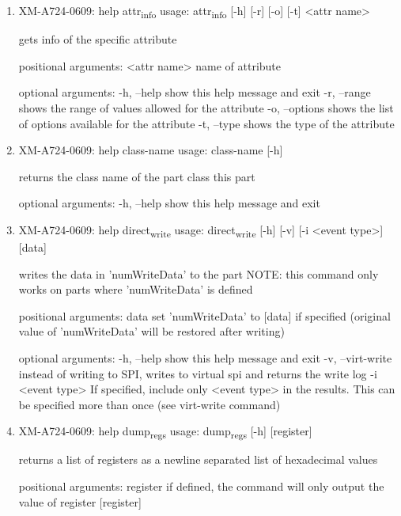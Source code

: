 \documentclass[11pt]{article}
\begin{document}
\begin{enumerate}
\item XM-A724-0609: help attr\textsubscript{info}
\label{sec:org6c905d6}
usage: attr\textsubscript{info} [-h] [-r] [-o] [-t] <attr name>

gets info of the specific attribute

positional arguments:
  <attr name>    name of attribute

optional arguments:
  -h, --help     show this help message and exit
  -r, --range    shows the range of values allowed for the attribute
  -o, --options  shows the list of options available for the attribute
  -t, --type     shows the type of the attribute

\item XM-A724-0609: help class-name
\label{sec:orgdc27a16}
usage: class-name [-h]

returns the class name of the part class this part

optional arguments:
  -h, --help  show this help message and exit

\item XM-A724-0609: help direct\textsubscript{write}
\label{sec:org0eb819e}
usage: direct\textsubscript{write} [-h] [-v] [-i <event type>] [data]

writes the data in 'numWriteData' to the part NOTE: this command only works on
parts where 'numWriteData' is defined

positional arguments:
  data              set 'numWriteData' to [data] if specified (original value
                    of 'numWriteData' will be restored after writing)

optional arguments:
  -h, --help        show this help message and exit
  -v, --virt-write  instead of writing to SPI, writes to virtual spi and
                    returns the write log
  -i <event type>   If specified, include only <event type> in the results.
                    This can be specified more than once (see virt-write
                    command)

\item XM-A724-0609: help dump\textsubscript{regs}
\label{sec:org94b482d}
usage: dump\textsubscript{regs} [-h] [register]

returns a list of registers as a newline separated list of hexadecimal values

positional arguments:
  register    if defined, the command will only output the value of register
              [register]


\end{enumerate}
\end{document}

